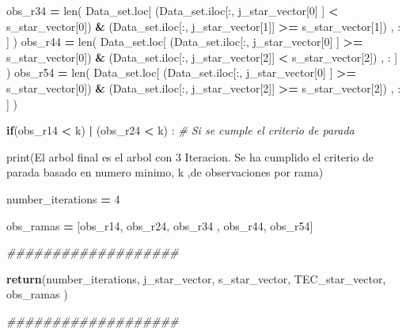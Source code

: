 \documentclass[
  11pt,
  a4paper,
]{article}
\newenvironment{Shaded}{\begin{snugshade}}{\end{snugshade}}
\newcommand{\BuiltInTok}[1]{#1}
\newcommand{\CommentTok}[1]{\textcolor[rgb]{0.56,0.35,0.01}{\textit{#1}}}
\newcommand{\ControlFlowTok}[1]{\textcolor[rgb]{0.13,0.29,0.53}{\textbf{#1}}}
\newcommand{\DecValTok}[1]{\textcolor[rgb]{0.00,0.00,0.81}{#1}}
\newcommand{\NormalTok}[1]{#1}
\newcommand{\OperatorTok}[1]{\textcolor[rgb]{0.81,0.36,0.00}{\textbf{#1}}}
\newcommand{\StringTok}[1]{\textcolor[rgb]{0.31,0.60,0.02}{#1}}
\begin{document}
\begin{Shaded}
\begin{Highlighting}[]
\NormalTok{        obs\_r34 }\OperatorTok{=} \BuiltInTok{len}\NormalTok{( Data\_set.loc[ (Data\_set.iloc[:, j\_star\_vector[}\DecValTok{0}\NormalTok{] ] }\OperatorTok{\textless{}}\NormalTok{ s\_star\_vector[}\DecValTok{0}\NormalTok{]) }\OperatorTok{\&}\NormalTok{ (Data\_set.iloc[:, j\_star\_vector[}\DecValTok{1}\NormalTok{]] }\OperatorTok{\textgreater{}=}\NormalTok{ s\_star\_vector[}\DecValTok{1}\NormalTok{]) , : ] )}
\NormalTok{        obs\_r44 }\OperatorTok{=} \BuiltInTok{len}\NormalTok{( Data\_set.loc[ (Data\_set.iloc[:, j\_star\_vector[}\DecValTok{0}\NormalTok{] ] }\OperatorTok{\textgreater{}=}\NormalTok{ s\_star\_vector[}\DecValTok{0}\NormalTok{]) }\OperatorTok{\&}\NormalTok{ (Data\_set.iloc[:, j\_star\_vector[}\DecValTok{2}\NormalTok{]] }\OperatorTok{\textless{}}\NormalTok{ s\_star\_vector[}\DecValTok{2}\NormalTok{]) , : ] )}
\NormalTok{        obs\_r54 }\OperatorTok{=} \BuiltInTok{len}\NormalTok{( Data\_set.loc[ (Data\_set.iloc[:, j\_star\_vector[}\DecValTok{0}\NormalTok{] ] }\OperatorTok{\textgreater{}=}\NormalTok{ s\_star\_vector[}\DecValTok{0}\NormalTok{]) }\OperatorTok{\&}\NormalTok{ (Data\_set.iloc[:, j\_star\_vector[}\DecValTok{2}\NormalTok{]] }\OperatorTok{\textgreater{}=}\NormalTok{ s\_star\_vector[}\DecValTok{2}\NormalTok{]) , : ] )}


        \ControlFlowTok{if}\NormalTok{(obs\_r14 }\OperatorTok{\textless{}}\NormalTok{ k) }\OperatorTok{|}\NormalTok{ (obs\_r24 }\OperatorTok{\textless{}}\NormalTok{ k) : }\CommentTok{\# Si se cumple el criterio de parada}


            \BuiltInTok{print}\NormalTok{(}\StringTok{\textquotesingle{}El arbol final es el arbol con 3 Iteracion. Se ha cumplido el criterio de parada basado en numero minimo\textquotesingle{}}\NormalTok{, k ,}\StringTok{\textquotesingle{}de observaciones por rama\textquotesingle{}}\NormalTok{)}

\NormalTok{            number\_iterations }\OperatorTok{=} \DecValTok{4}
            
\NormalTok{            obs\_ramas }\OperatorTok{=}\NormalTok{ [obs\_r14, obs\_r24, obs\_r34 , obs\_r44, obs\_r54]}

            
            \CommentTok{\#\#\#\#\#\#\#\#\#\#\#\#\#\#\#\#\#\#\#}
            
            \ControlFlowTok{return}\NormalTok{(number\_iterations, j\_star\_vector, s\_star\_vector, TEC\_star\_vector, obs\_ramas ) }

            \CommentTok{\#\#\#\#\#\#\#\#\#\#\#\#\#\#\#\#\#\#\#}



\end{Highlighting}
\end{Shaded}
\end{document}
